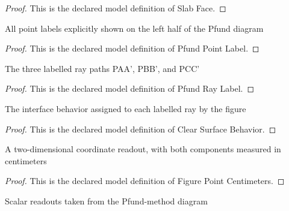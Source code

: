 \begin{proof}
  This is the declared model definition of Slab Face.
\end{proof}
\begin{definition}
  \label{def:physics:phyx-mini-0022:phyxminiproblems-problemphyxmini0022-pfundpointlabel}
  All point labels explicitly shown on the left half of the Pfund diagram
\end{definition}
\begin{proof}
  This is the declared model definition of Pfund Point Label.
\end{proof}
\begin{definition}
  \label{def:physics:phyx-mini-0022:phyxminiproblems-problemphyxmini0022-pfundraylabel}
  The three labelled ray paths PAA', PBB', and PCC'
\end{definition}
\begin{proof}
  This is the declared model definition of Pfund Ray Label.
\end{proof}
\begin{definition}
  \label{def:physics:phyx-mini-0022:phyxminiproblems-problemphyxmini0022-clearsurfacebehavior}
  The interface behavior assigned to each labelled ray by the figure
\end{definition}
\begin{proof}
  This is the declared model definition of Clear Surface Behavior.
\end{proof}
\begin{definition}
  \label{def:physics:phyx-mini-0022:phyxminiproblems-problemphyxmini0022-figurepointcentimeters}
  A two-dimensional coordinate readout, with both components measured in centimeters
\end{definition}
\begin{proof}
  This is the declared model definition of Figure Point Centimeters.
\end{proof}
\begin{definition}
  \label{def:physics:phyx-mini-0022:phyxminiproblems-problemphyxmini0022-pfundfigurereadout}
  Scalar readouts taken from the Pfund-method diagram
\end{definition}
